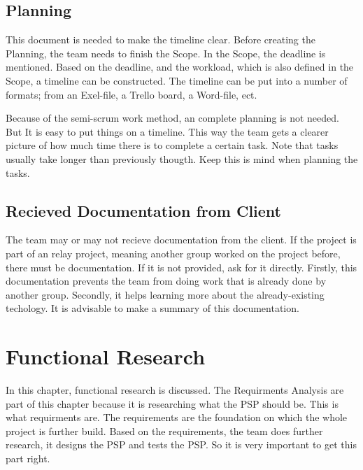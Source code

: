 \documentclass[10pt]{report}
\begin{document}
\newpage

\section{Planning}

This document is needed to make the timeline clear. Before creating the Planning, the team needs to finish the Scope. In the Scope, the deadline is mentioned. Based on the deadline, and the workload, which is also defined in the Scope, a timeline can be constructed. The timeline can be put into a number of formats; from an Exel-file, a Trello board, a Word-file, ect.

Because of the semi-scrum work method, an complete planning is not needed. But It is easy to put things on a timeline. This way the team gets a clearer picture of how much time there is to complete a certain task. Note that tasks usually take longer than previously thougth. Keep this is mind when planning the tasks.

\newpage

\section{Recieved Documentation from Client}

The team may or may not recieve documentation from the client. If the project is part of an relay project, meaning another group worked on the project before, there must be documentation. If it is not provided, ask for it directly. Firstly, this documentation prevents the team from doing work that is already done by another group. Secondly, it helps learning more about the already-existing techology. It is advisable to make a summary of this documentation.

\newpage


\chapter{Functional Research}
\thispagestyle{fancy}

In this chapter, functional research is discussed. The Requirments Analysis are part of this chapter because it is researching what the PSP should be. This is what requirments are. The requirements are the foundation on which the whole project is further build. Based on the requirements, the team does further research, it designs the PSP and tests the PSP. So it is very important to get this part right.
\end{document}
